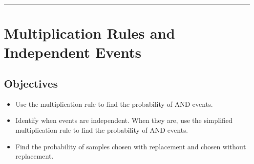 \documentclass[letterpaper,10pt,english]{jupyterBook}
\begin{document}
\bigskip\hrule\bigskip


\sphinxstepscope


\section{Multiplication Rules and Independent Events}
\label{\detokenize{Ch3 Probability/3.3 Multiplication Rules and Independent Events:multiplication-rules-and-independent-events}}\label{\detokenize{Ch3 Probability/3.3 Multiplication Rules and Independent Events::doc}}

\subsection{Objectives}
\label{\detokenize{Ch3 Probability/3.3 Multiplication Rules and Independent Events:objectives}}\begin{itemize}
\item {} 
\sphinxAtStartPar
Use the multiplication rule to find the probability of \(\text{AND}\) events.

\item {} 
\sphinxAtStartPar
Identify when events are independent. When they are, use the simplified multiplication rule to find the probability of \(\text{AND}\) events.

\item {} 
\sphinxAtStartPar
Find the probability of samples chosen with replacement and chosen without replacement.

\end{itemize}
\end{document}
